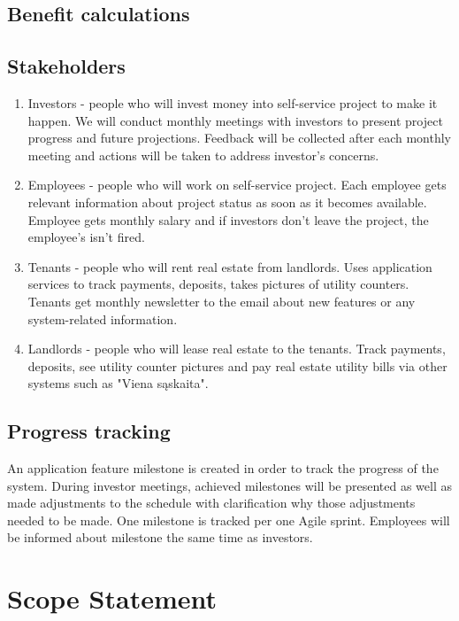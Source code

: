 \documentclass{VUMIFPSkursinis}
\begin{document}
	\subsection{Benefit calculations}

	\subsection{Stakeholders}
		\begin{enumerate}
			\item{Investors - people who will invest money into self-service project to make it happen. 
				We will conduct monthly meetings with investors to present project progress and future projections.
				Feedback will be collected after each monthly meeting and actions will be taken to address investor's concerns.}
			\item{Employees - people who will work on self-service project.
				Each employee gets relevant information about project status as soon as it becomes available.
				Employee gets monthly salary and if investors don't leave the project, the employee's isn't fired.}
			\item{Tenants - people who will rent real estate from landlords.
					Uses application services to track payments, deposits, takes pictures of utility counters.
					Tenants get monthly newsletter to the email about new features or any system-related information.}
			\item{Landlords - people who will lease real estate to the tenants.
					Track payments, deposits, see utility counter pictures and pay real estate utility bills via other systems such as "Viena sąskaita".}
		\end{enumerate}

	\subsection{Progress tracking}
		An application feature milestone is created in order to track the progress of the system.
		During investor meetings, achieved milestones will be presented as well as made adjustments to the schedule with clarification why those adjustments needed to be made.
		One milestone is tracked per one Agile sprint.
		Employees will be informed about milestone the same time as investors.


\section{Scope Statement}
\end{document}
